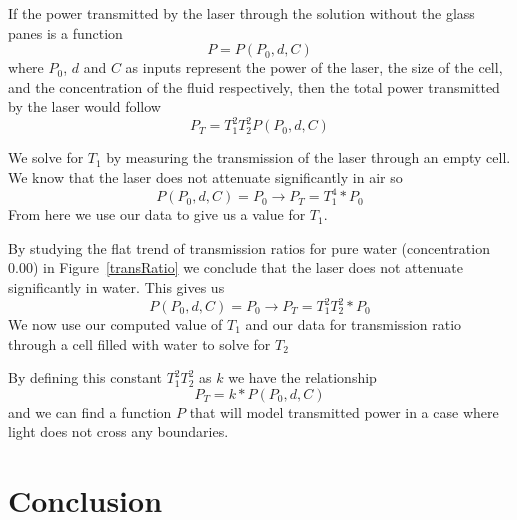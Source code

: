 \documentclass[aps,prl,reprint,groupedaddress,amsmath,amssymb,aps]{revtex4-1}
\begin{document}
	If the power transmitted by the laser through the solution without the glass panes is a function
	\begin{equation}
		P = P(P_0, d, C)
	\end{equation}
	where $P_0$, $d$ and $C$ as inputs represent the power of the laser, the size of the cell, and the concentration of the fluid respectively, then the total power transmitted by the laser would follow
	\begin{equation}
		P_T=T_1^2T_2^2P(P_0,d,C)
	\end{equation}
	
	We solve for $T_1$ by measuring the transmission of the laser through an empty cell. We know that the laser does not attenuate significantly in air so
	\begin{equation}
		P(P_0, d, C) = P_0 \rightarrow P_T=T_1^4*P_0
	\end{equation}
	From here we use our data to give us a value for $T_1$.
	
	By studying the flat trend of transmission ratios for pure water (concentration 0.00) in Figure~\ref{transRatio} we conclude that the laser does not attenuate significantly in water. This gives us
	\begin{equation}
	P(P_0, d, C) = P_0 \rightarrow P_T=T_1^2T_2^2*P_0
	\end{equation}
	We now use our computed value of $T_1$ and our data for transmission ratio through a cell filled with water to solve for $T_2$
	
	By defining this constant $T_1^2T_2^2$ as $k$ we have the relationship
	\begin{equation}
		P_T=k*P(P_0,d,C)
	\end{equation}
	and we can find a function $P$ that will model transmitted power in a case where light does not cross any boundaries.
	
	\section{\label{sec:level1}Conclusion}
	
\end{document}
